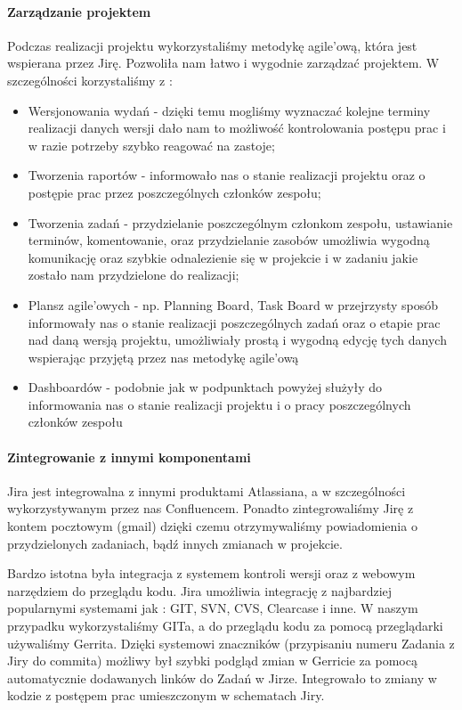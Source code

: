 \documentclass[licencjacka]{pracamgr}
\begin{document}
\paragraph{Zarządzanie projektem} 
Podczas realizacji projektu wykorzystaliśmy metodykę agile'ową, która jest wspierana przez Jirę. 
Pozwoliła nam łatwo i wygodnie zarządzać projektem. W szczególności korzystaliśmy z :
\begin{itemize}
\item Wersjonowania wydań - dzięki temu mogliśmy wyznaczać kolejne terminy realizacji danych wersji 
  dało nam to możliwość kontrolowania postępu prac i w razie potrzeby szybko reagować na zastoje;
\item Tworzenia raportów - informowało nas o stanie realizacji projektu oraz o postępie prac przez poszczególnych członków zespołu;
\item Tworzenia zadań - przydzielanie poszczególnym członkom zespołu, ustawianie terminów, komentowanie, oraz przydzielanie zasobów 
umożliwia wygodną komunikację oraz szybkie odnalezienie się w projekcie i w zadaniu jakie zostało nam przydzielone do realizacji;
\item Plansz agile'owych - np. Planning Board, Task Board w przejrzysty sposób informowały nas o stanie realizacji poszczególnych zadań oraz o 
etapie prac nad daną wersją projektu, umożliwiały prostą i wygodną edycję tych danych wspierając przyjętą przez nas metodykę agile'ową
\item Dashboardów - podobnie jak w podpunktach powyżej służyły do informowania nas o stanie realizacji projektu i o pracy poszczególnych członków zespołu
\end{itemize}

\paragraph{Zintegrowanie z innymi komponentami}
Jira jest integrowalna z innymi produktami Atlassiana, a w szczególności wykorzystywanym przez nas Confluencem.
Ponadto zintegrowaliśmy Jirę z kontem pocztowym (gmail) dzięki czemu otrzymywaliśmy powiadomienia o przydzielonych zadaniach, bądź innych zmianach w projekcie.

Bardzo istotna była integracja z systemem kontroli wersji oraz z webowym narzędziem do przeglądu kodu.
Jira umożliwia integrację z najbardziej popularnymi systemami jak : GIT, SVN, CVS, Clearcase i inne.
W naszym przypadku wykorzystaliśmy GITa, a do przeglądu kodu za pomocą przeglądarki używaliśmy Gerrita. 
Dzięki systemowi znaczników (przypisaniu numeru Zadania z Jiry do commita) możliwy był szybki podgląd zmian w Gerricie za pomocą automatycznie dodawanych linków do Zadań w Jirze.
Integrowało to zmiany w kodzie z postępem prac umieszczonym w schematach Jiry.  
\end{document}
